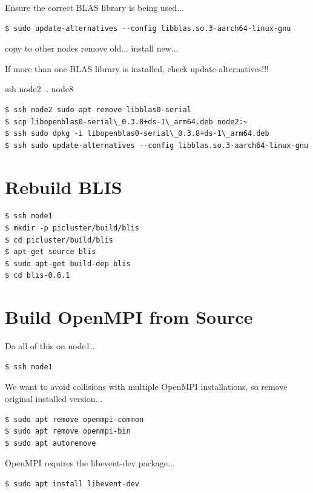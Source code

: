 \documentclass{report}
\begin{document}
Ensure the correct BLAS library is being used...

\lstset{style=type}
\begin{lstlisting}
$ sudo update-alternatives --config libblas.so.3-aarch64-linux-gnu
\end{lstlisting}

copy to other nodes
remove old...
install new...

If more than one BLAS library is installed, check update-alternatives!!!

ssh node2 .. node8
\lstset{style=type}
\begin{lstlisting}
$ ssh node2 sudo apt remove libblas0-serial
$ scp libopenblas0-serial\_0.3.8+ds-1\_arm64.deb node2:~
$ ssh sudo dpkg -i libopenblas0-serial\_0.3.8+ds-1\_arm64.deb
$ ssh sudo update-alternatives --config libblas.so.3-aarch64-linux-gnu
\end{lstlisting}


%
%
\chapter{Rebuild BLIS}

\lstset{style=type}
\begin{lstlisting}
$ ssh node1
$ mkdir -p picluster/build/blis
$ cd picluster/build/blis
$ apt-get source blis
$ sudo apt-get build-dep blis
$ cd blis-0.6.1
\end{lstlisting}


%
%

\chapter{Build OpenMPI from Source}

Do all of this on node1...

\lstset{style=type}
\begin{lstlisting}
$ ssh node1
\end{lstlisting}

We want to avoid collisions with multiple OpenMPI installations, so remove original installed version...

\lstset{style=type}
\begin{lstlisting}
$ sudo apt remove openmpi-common
$ sudo apt remove openmpi-bin
$ sudo apt autoremove 
\end{lstlisting}

OpenMPI requires the libevent-dev package...

\lstset{style=type}
\begin{lstlisting}
$ sudo apt install libevent-dev
\end{lstlisting}
\end{document}
